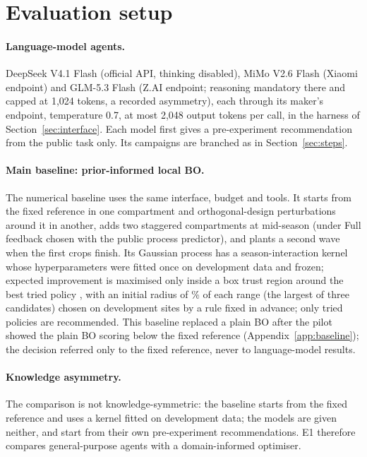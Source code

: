 \section{Evaluation setup}
\label{sec:setup}
\paragraph{Language-model agents.} DeepSeek V4.1 Flash (official API, thinking disabled), MiMo V2.6 Flash (Xiaomi endpoint) and GLM-5.3 Flash (Z.AI endpoint; reasoning mandatory there and capped at 1{,}024 tokens, a recorded asymmetry), each through its maker's endpoint, temperature 0.7, at most 2{,}048 output tokens per call, in the harness of Section~\ref{sec:interface}. Each model first gives a pre-experiment recommendation from the public task only. Its campaigns are branched as in Section~\ref{sec:steps}.

\paragraph{Main baseline: prior-informed local BO.} The numerical baseline uses the same interface, budget and tools. It starts from the fixed reference in one compartment and orthogonal-design perturbations around it in another, adds two staggered compartments at mid-season (under Full feedback chosen with the public process predictor), and plants a second wave when the first crops finish. Its Gaussian process has a season-interaction kernel whose hyperparameters were fitted once on development data and frozen; expected improvement is maximised only inside a box trust region around the best tried policy \citep[TuRBO rules,][]{eriksson2019turbo}, with an initial radius of \% of each range (the largest of three candidates) chosen on development sites by a rule fixed in advance; only tried policies are recommended. This baseline replaced a plain BO after the pilot showed the plain BO scoring below the fixed reference (Appendix~\ref{app:baseline}); the decision referred only to the fixed reference, never to language-model results.

\paragraph{Knowledge asymmetry.} The comparison is not knowledge-symmetric: the baseline starts from the fixed reference and uses a kernel fitted on development data; the models are given neither, and start from their own pre-experiment recommendations. E1 therefore compares general-purpose agents with a domain-informed optimiser.

